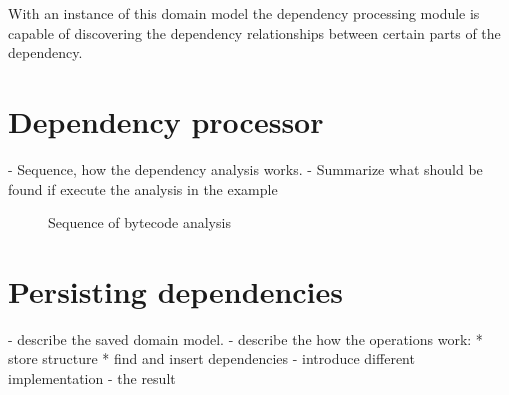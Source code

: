 With an instance of this domain model the dependency processing module is capable of 
discovering the dependency relationships between certain parts of the dependency.
 
 
 
\section{Dependency processor}
- Sequence, how the dependency analysis works. 
- Summarize what should be found if execute the analysis in the example
\begin{figure}[htb]                                            
   \center   
   \caption{Sequence of bytecode analysis} 
   \label{fig:analization.pdf}  
\end{figure}

\section{Persisting dependencies} 
- describe the saved domain model.
- describe the how the operations work:
 * store structure
 * find and insert dependencies
- introduce different implementation 
- the result 

